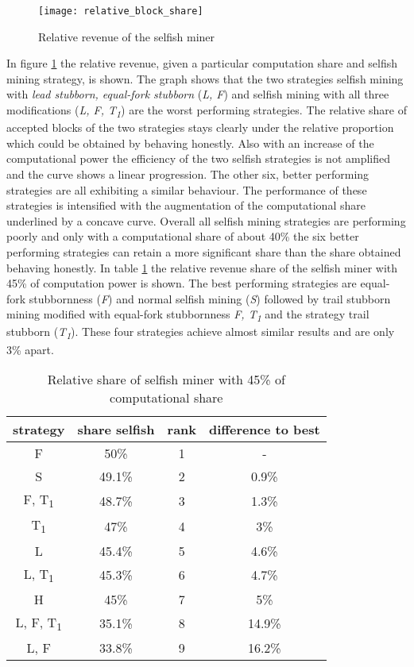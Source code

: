 \begin{figure}[t]
\texttt{[image: relative\_block\_share]}
\centering
\caption{Relative revenue of the selfish miner}
\label{fig:relative_block_share}
\end{figure}

In figure \ref{fig:relative_block_share} the relative revenue, given a particular computation share and selfish mining strategy, is shown.
The graph shows that the two strategies selfish mining with \textit{lead stubborn, equal-fork stubborn} (\textit{L, F}) and selfish mining with all three modifications (\textit{L, F, T\textsubscript{1}}) are the worst performing strategies.
The relative share of accepted blocks of the two strategies stays clearly under the relative proportion which could be obtained by behaving honestly.
Also with an increase of the computational power the efficiency of the two selfish strategies is not amplified and the curve shows a linear progression.
The other six, better performing strategies are all exhibiting a similar behaviour.
The performance of these strategies is intensified with the augmentation of the computational share underlined by a concave curve.
Overall all selfish mining strategies are performing poorly and only with a computational share of about 40\% the six better performing strategies can retain a more significant share than the share obtained behaving honestly.
In table \ref{tab:relative_share_45} the relative  revenue share of the selfish miner with 45\% of computation power is shown.
The best performing strategies are equal-fork stubbornness (\textit{F}) and normal selfish mining (\textit{S}) followed by trail stubborn mining modified with equal-fork stubbornness \textit{F, T\textsubscript{1}} and the strategy trail stubborn (\textit{T\textsubscript{1}}).
These four strategies achieve almost similar results and are only 3\% apart.

\begin{table}
  \centering
  \begin{tabular}{cccc}
    \toprule
    strategy & share selfish & rank & difference to best\\
    \midrule
    F & 50\% & 1 & - \\
    S & 49.1\% & 2 & 0.9\% \\
    F, T\textsubscript{1} & 48.7\% & 3 & 1.3\% \\
    T\textsubscript{1} & 47\% & 4 & 3\% \\
    L & 45.4\% & 5 & 4.6\% \\
    L, T\textsubscript{1} & 45.3\% & 6 & 4.7\% \\
    H & 45\% & 7 & 5\% \\
    L, F, T\textsubscript{1} & 35.1\% & 8 & 14.9\% \\
    L, F & 33.8\% & 9 & 16.2\% \\
    \bottomrule
  \end{tabular}
  \caption{Relative share of selfish miner with 45\% of computational share}
  \label{tab:relative_share_45}
\end{table}

